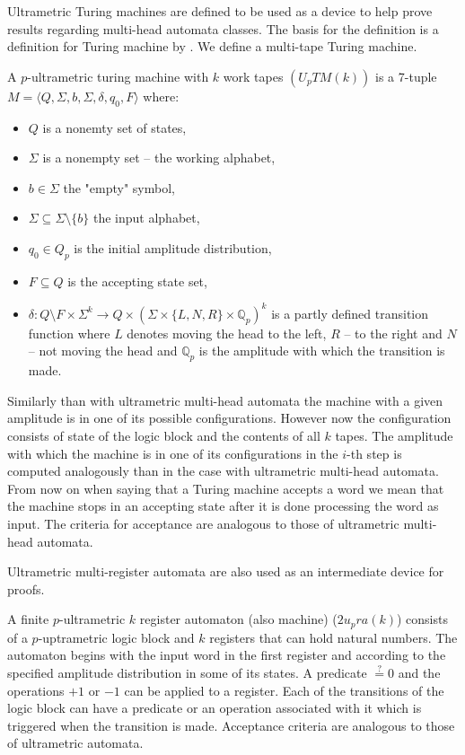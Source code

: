 \documentclass{llncs}
\begin{document}
Ultrametric Turing machines are defined to be used as a device to help prove results regarding multi-head automata classes. The basis for the definition is a definition for Turing machine by \citet{Hopcroft1979}. We define a multi-tape Turing machine.
\begin{definition}
A $p$-ultrametric turing machine with $k$ work tapes $(U_pTM(k))$ is a 7-tuple $M= \langle Q, \Sigma, b, \Sigma, \delta, q_0, F \rangle$ where:
\begin{itemize}
	\item $Q$ is a nonemty set of states,
	\item $\Sigma$ is a nonempty set -- the working alphabet,
	\item $b \in \Sigma$ the "empty" symbol,
	\item $\Sigma\subseteq\Sigma\setminus\{b\}$ the input alphabet,
	\item $q_0 \in Q_p$ is the initial amplitude distribution,
	\item $F \subseteq Q$ is the accepting state set,
	\item $\delta: Q \setminus F \times \Sigma^k \rightarrow Q \times \left(\Sigma \times \{L,N,R\} \times \mathbb{Q}_p \right)^k$ is a partly defined transition function where $L$ denotes moving the head to the left, $R$ -- to the right and $N$ -- not moving the head and $\mathbb{Q}_p$ is the amplitude with which the transition is made.
\end{itemize}
\end{definition}

Similarly than with ultrametric multi-head automata the machine with a given amplitude is in one of its possible configurations. However now the configuration consists of state of the logic block %
and the contents of all $k$ tapes. The amplitude with which the machine is in one of its configurations in the $i$-th step is computed analogously than in the case with ultrametric multi-head automata. From now on when saying that a Turing machine accepts a word we mean that the machine stops in an accepting state after it is done processing the word as input. The criteria for acceptance are analogous to those of ultrametric multi-head automata.

Ultrametric multi-register automata are also used as an intermediate device for proofs.
\begin{definition}
A finite $p$-ultrametric $k$ register automaton (also machine) ($2u_pra(k)$) consists of a $p$-uptrametric logic block and $k$ registers that can hold natural numbers. The automaton begins with the input word in the first register and according to the specified amplitude distribution in some of its states. A predicate $\stackrel{?}{=} 0$ and the operations $+1$ or $-1$ can be applied to a register. Each of the transitions of the logic block can have a predicate or an operation associated with it which is triggered when the transition is made. Acceptance criteria are analogous to those of ultrametric automata.
\end{definition}
\end{document}
